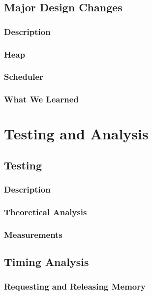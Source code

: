 \documentclass[12pt]{report}
\begin{document}
\chapter{Major Design Changes}

\section{Description}

\section{Heap}

\section{Scheduler}

\section{What We Learned}

\part{Testing and Analysis}

\chapter{Testing}

\section{Description}

\section{Theoretical Analysis}

\section{Measurements}

\chapter{Timing Analysis}

\section{Requesting and Releasing Memory}
\end{document}
